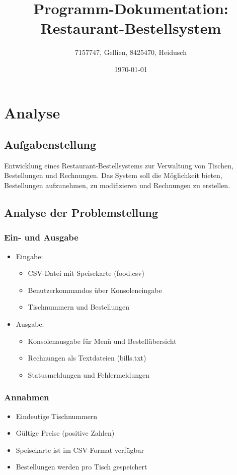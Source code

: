 \documentclass[a4paper,11pt]{article}
\title{Programm-Dokumentation: Restaurant-Bestellsystem}
\author{7157747, Gellien, 8425470, Heidusch}
\date{\today}
\begin{document}
\maketitle

\section{Analyse}

\subsection{Aufgabenstellung}
Entwicklung eines Restaurant-Bestellsystems zur Verwaltung von Tischen, Bestellungen und Rechnungen. Das System soll die Möglichkeit bieten, Bestellungen aufzunehmen, zu modifizieren und Rechnungen zu erstellen.

\subsection{Analyse der Problemstellung}
\subsubsection{Ein- und Ausgabe}
\begin{itemize}
    \item Eingabe:
    \begin{itemize}
        \item CSV-Datei mit Speisekarte (food.csv)
        \item Benutzerkommandos über Konsoleneingabe
        \item Tischnummern und Bestellungen
    \end{itemize}

    \item Ausgabe:
    \begin{itemize}
        \item Konsolenausgabe für Menü und Bestellübersicht
        \item Rechnungen als Textdateien (bills.txt)
        \item Statusmeldungen und Fehlermeldungen
    \end{itemize}
\end{itemize}

\subsubsection{Annahmen}
\begin{itemize}
    \item Eindeutige Tischnummern
    \item Gültige Preise (positive Zahlen)
    \item Speisekarte ist im CSV-Format verfügbar
    \item Bestellungen werden pro Tisch gespeichert
\end{itemize}
\end{document}
